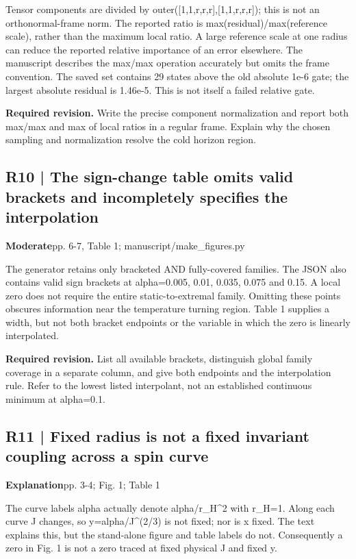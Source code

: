 \documentclass[10pt,a4paper]{article}
\begin{document}
Tensor components are divided by outer([1,1,r,r,r],[1,1,r,r,r]); this is not an orthonormal-frame norm. The reported ratio is max(residual)/max(reference scale), rather than the maximum local ratio. A large reference scale at one radius can reduce the reported relative importance of an error elsewhere. The manuscript describes the max/max operation accurately but omits the frame convention. The saved set contains 29 states above the old absolute 1e-6 gate; the largest absolute residual is 1.46e-5. This is not itself a failed relative gate.

\textbf{Required revision.} Write the precise component normalization and report both max/max and max of local ratios in a regular frame. Explain why the chosen sampling and normalization resolve the cold horizon region.

\subsection*{R10 | The sign-change table omits valid brackets and incompletely specifies the interpolation}
\textbf{Moderate}\quad pp. 6-7, Table 1; manuscript/make\_figures.py

The generator retains only bracketed AND fully-covered families. The JSON also contains valid sign brackets at alpha=0.005, 0.01, 0.035, 0.075 and 0.15. A local zero does not require the entire static-to-extremal family. Omitting these points obscures information near the temperature turning region. Table 1 supplies a width, but not both bracket endpoints or the variable in which the zero is linearly interpolated.

\textbf{Required revision.} List all available brackets, distinguish global family coverage in a separate column, and give both endpoints and the interpolation rule. Refer to the lowest listed interpolant, not an established continuous minimum at alpha=0.1.

\subsection*{R11 | Fixed radius is not a fixed invariant coupling across a spin curve}
\textbf{Explanation}\quad pp. 3-4; Fig. 1; Table 1

The curve labels alpha actually denote alpha/r\_H\textasciicircum{}2 with r\_H=1. Along each curve J changes, so y=alpha/J\textasciicircum{}(2/3) is not fixed; nor is x fixed. The text explains this, but the stand-alone figure and table labels do not. Consequently a zero in Fig. 1 is not a zero traced at fixed physical J and fixed y.
\end{document}
